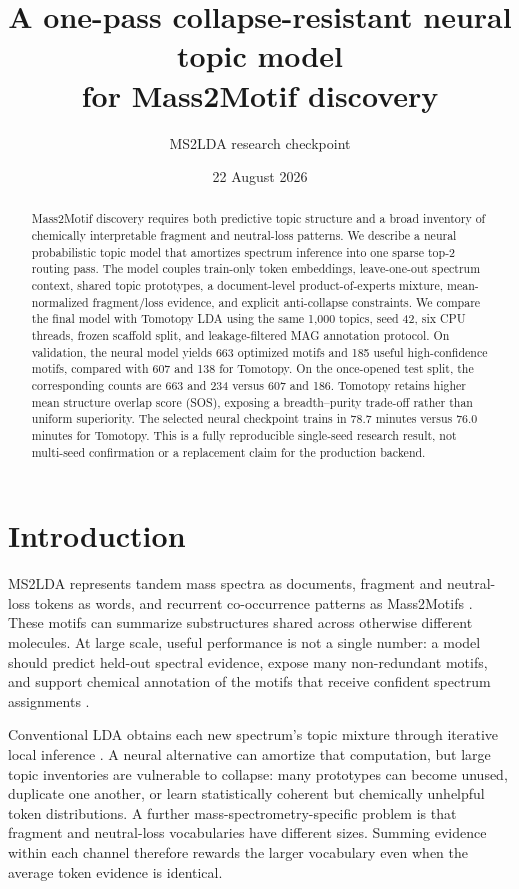 \documentclass[10pt,a4paper]{article}
\title{A one-pass collapse-resistant neural topic model\\for Mass2Motif discovery}
\author{MS2LDA research checkpoint}
\date{22 August 2026}
\begin{document}
\maketitle

\begin{abstract}
Mass2Motif discovery requires both predictive topic structure and a broad
inventory of chemically interpretable fragment and neutral-loss patterns. We
describe a neural probabilistic topic model that amortizes spectrum inference
into one sparse top-2 routing pass. The model couples train-only token
embeddings, leave-one-out spectrum context, shared topic prototypes, a
document-level product-of-experts mixture, mean-normalized fragment/loss
evidence, and explicit anti-collapse constraints. We compare the final model
with Tomotopy LDA using the same 1,000 topics, seed 42, six CPU threads, frozen
scaffold split, and leakage-filtered MAG annotation protocol. On validation,
the neural model yields 663 optimized motifs and 185 useful high-confidence
motifs, compared with 607 and 138 for Tomotopy. On the once-opened test split,
the corresponding counts are 663 and 234 versus 607 and 186. Tomotopy retains
higher mean structure overlap score (SOS), exposing a breadth--purity trade-off
rather than uniform superiority. The selected neural checkpoint trains in 78.7
minutes versus 76.0 minutes for Tomotopy. This is a fully reproducible
single-seed research result, not multi-seed confirmation or a replacement
claim for the production backend.
\end{abstract}

\section{Introduction}

MS2LDA represents tandem mass spectra as documents, fragment and neutral-loss
tokens as words, and recurrent co-occurrence patterns as Mass2Motifs
\cite{vanderhooft2016}. These motifs can summarize substructures shared across
otherwise different molecules. At large scale, useful performance is not a
single number: a model should predict held-out spectral evidence, expose many
non-redundant motifs, and support chemical annotation of the motifs that receive
confident spectrum assignments \cite{torresortega2026}.

Conventional LDA obtains each new spectrum's topic mixture through iterative
local inference \cite{blei2003}. A neural alternative can amortize that
computation, but large
topic inventories are vulnerable to collapse: many prototypes can become
unused, duplicate one another, or learn statistically coherent but chemically
unhelpful token distributions. A further mass-spectrometry-specific problem is
that fragment and neutral-loss vocabularies have different sizes. Summing
evidence within each channel therefore rewards the larger vocabulary even when
the average token evidence is identical.
\end{document}
